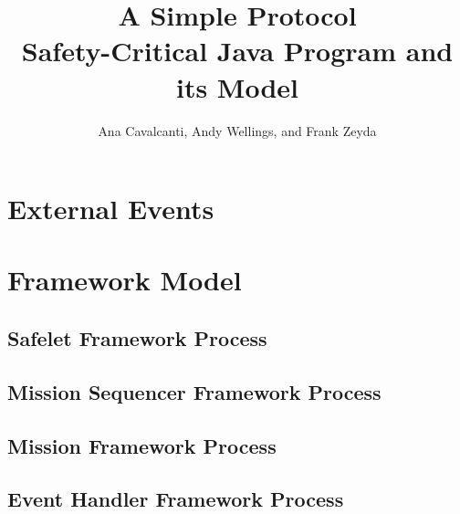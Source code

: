 \documentclass{article}
\title{A Simple Protocol\\Safety-Critical Java Program and its {\Circus} Model}
\author{Ana Cavalcanti, Andy Wellings, and Frank Zeyda}
\begin{document}
\maketitle

\tableofcontents

\newpage


\section{External Events}

\begin{circusbox}

\end{circusbox}

\newpage


\section{Framework Model}

\subsection{Safelet Framework Process}

\begin{circusbox}

\end{circusbox}

\subsection{Mission Sequencer Framework Process}

\begin{circusbox}

\end{circusbox}

\subsection{Mission Framework Process}

\begin{circusbox}

\end{circusbox}

\subsection{Event Handler Framework Process}
\end{document}
